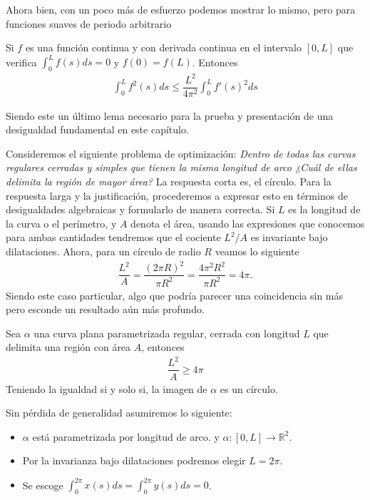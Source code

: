 \documentclass[oneside,11pt]{memoir}
\begin{document}
Ahora bien, con un poco más de esfuerzo podemos mostrar lo mismo, pero para funciones suaves de periodo arbitrario
\begin{theorem}
    Si $f$ es una función continua y con derivada continua en el intervalo $[0,L]$ que verifica $\int_{0}^Lf(s)ds=0$ y $f(0)=f(L)$.  Entonces
    \begin{align*}
        \int_0^L f^2(s)ds\leq \dfrac{L^2}{4\pi^2}\int_0^L f'(s)^2ds
    \end{align*}
\end{theorem}
Siendo este un último lema necesario para la prueba y presentación de una desigualdad fundamental en este capítulo.

Consideremos el siguiente problema de optimización: \textit{Dentro de todas las curvas regulares cerradas y simples que tienen la misma longitud de arco ¿Cuál de ellas delimita la región de mayor área?} La respuesta corta es, el círculo. Para la respuesta larga y la justificación, procederemos a expresar esto en términos de desigualdades algebraicas y formularlo de manera correcta. Si $L$ es la longitud de la curva o el perímetro, y $A$ denota el área, usando las expresiones que conocemos para ambas cantidades tendremos que el cociente $L^2/A$ es invariante bajo dilataciones. Ahora, para un círculo de radio $R$ veamos lo siguiente
\begin{align*}
    \dfrac{L^2}{A}=\dfrac{(2\pi R)^2}{\pi R^2}=\dfrac{4\pi^2 R^2}{\pi R^2}=4\pi.
\end{align*}
Siendo este caso particular, algo que podría parecer una coincidencia sin más pero esconde un resultado aún más profundo.
\begin{theorem}
    Sea $\alpha$ una curva plana parametrizada regular, cerrada con longitud $L$ que delimita una región con área $A$, entonces
    \begin{align*}
        \dfrac{L^2}{A}\geq 4\pi
    \end{align*}
    Teniendo la igualdad si y solo si, la imagen de $\alpha$ es un círculo.
\end{theorem}
Sin pérdida de generalidad asumiremos lo siguiente:
\begin{itemize}
    \item $\alpha$ está parametrizada por longitud de arco. y $\alpha:[0,L]\to\mathbb{R}^2$.
    \item Por la invarianza bajo dilataciones podremos elegir $L=2\pi$. 
    \item Se escoge $\int_{0}^{2\pi} x(s)ds=\int_{0}^{2\pi} y(s)ds=0$.
\end{itemize}
\end{document}
